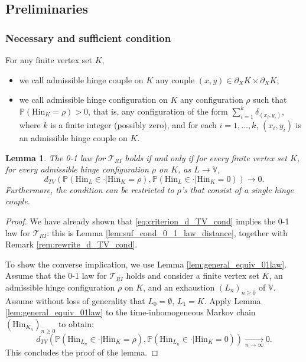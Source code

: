 \documentclass[12pt,a4paper]{article}
\newtheorem{lemma}[theo]{Lemma}
\newcommand{\1}[1]{{\mathbf 1}{\{#1\}}}
\newcommand{\8}{{\infty}}
\newcommand{\p}{\mathbb{P}}
\newcommand{\Hin}{\mathrm{Hin}}
\begin{document}
\subsection{Preliminaries}

\subsubsection{Necessary and sufficient condition}\label{sec:necessary_and_sufficient_for_quantitative}

For any finite vertex set $K$, 
\begin{itemize}
\item we call admissible hinge couple on $K$ any couple $(x,y)\in \partial_X K \times \partial_X K $;
\item we call admissible hinge configuration on $K$ any configuration $\rho$ such that $\p(\Hin_K=\rho)>0$, that is, any configuration of the form $\sum_{i=1}^k \delta_{(x_i,y_i)}$, where $k$ is a finite integer (possibly zero), and for each $i=1, \dots, k$, $(x_i,y_i)$ is an admissible hinge couple on $K$. 
\end{itemize}

\begin{lemma}\label{lem:criterion_dTV_to_0_law}
  The 0-1 law for $\mathcal{T}_{RI}$ holds if and only if for every finite vertex set $K$, for every admissible hinge configuration $\rho$ on $K$, as $L\to \mathbb{V}$,
  \begin{equation}\label{eq:criterion_d_TV_cond}
    d_{TV}\left(\mathbb{P}(\Hin_L \in \cdot | \Hin_K=\rho),
    \mathbb{P}(\Hin_L \in \cdot | \Hin_K=0) \right) \to 0.
  \end{equation}
  Furthermore, the condition can be restricted to $\rho$'s that consist of a single hinge couple.
\end{lemma}

\begin{proof}
  We have already shown that \eqref{eq:criterion_d_TV_cond} implies the 0-1 law for $\mathcal{T}_{RI}$: this is Lemma \ref{lem:suf_cond_0_1_law_distance}, together with Remark \ref{rem:rewrite_d_TV_cond}. 
  
  To show the converse implication, we use Lemma \ref{lem:general_equiv_01law}. Assume that the 0-1 law for $\mathcal{T}_{RI}$ holds and consider a finite vertex set $K$, an admissible hinge configuration $\rho$ on $K$, and an exhaustion $(L_n)_{n\ge 0}$ of $\mathbb{V}$. Assume without loss of generality that $L_0=\emptyset$, $L_1=K$. Apply Lemma \ref{lem:general_equiv_01law} to the time-inhomogeneous Markov chain $(\Hin_{K_n})_{n\ge 0}$ to obtain:
  \begin{equation}
    d_{TV}\left(\mathbb{P}(\Hin_{L_n} \in \cdot | \Hin_K=\rho),
    \mathbb{P}(\Hin_{L_n} \in \cdot | \Hin_K=0) \right) 
    \underset{n\to\infty}\longrightarrow 0.
  \end{equation}
  This concludes the proof of the lemma.
\end{proof}
\end{document}
